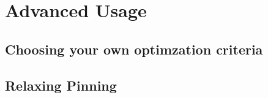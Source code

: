 \section{Advanced Usage}

\subsection{Choosing your own optimzation criteria}

\subsection{Relaxing Pinning}
